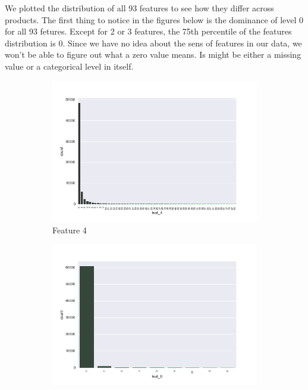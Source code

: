 \documentclass[a4paper,english,12pt]{article}
\begin{document}
We plotted the distribution of all 93 features to see how they differ across products. The first thing to notice in the figures below is the dominance of  level 0 for all 93 fetures. Except for 2 or 3 features, the 75th percentile of the features distribution is 0. Since we have no idea about the sens of features in our data, we won't be able to figure out what a zero value means. Is might be either a missing value or a categorical level in itself. 

\begin{figure}[H]
	\centering
	\begin{subfigure}{0.22\textwidth}
		\includegraphics[width=\textwidth]{feat_4}
		\caption{Feature 4}
	\end{subfigure}
	\begin{subfigure}{0.22\textwidth}
		\includegraphics[width=\textwidth]{feat_6}

\end{subfigure}
\end{figure}
\end{document}
